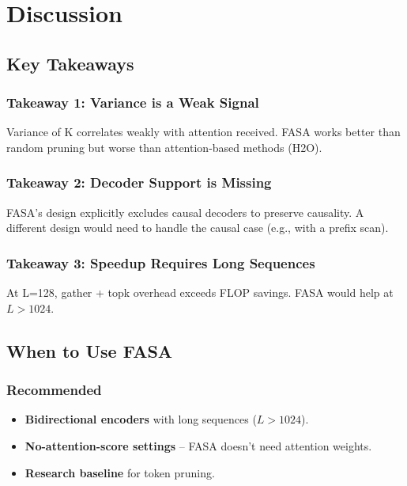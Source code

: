 
\section{Discussion}

\subsection{Key Takeaways}

\subsubsection{Takeaway 1: Variance is a Weak Signal}

Variance of K correlates weakly with attention received. FASA works better 
than random pruning but worse than attention-based methods (H2O).

\subsubsection{Takeaway 2: Decoder Support is Missing}

FASA's design explicitly excludes causal decoders to preserve causality. 
A different design would need to handle the causal case (e.g., with a 
prefix scan).

\subsubsection{Takeaway 3: Speedup Requires Long Sequences}

At L=128, gather + topk overhead exceeds FLOP savings. FASA would help at 
$L > 1024$.

\subsection{When to Use FASA}

\subsubsection{Recommended}

\begin{itemize}
\item \textbf{Bidirectional encoders} with long sequences ($L > 1024$).
\item \textbf{No-attention-score settings} -- FASA doesn't need attention weights.
\item \textbf{Research baseline} for token pruning.

\end{itemize}
